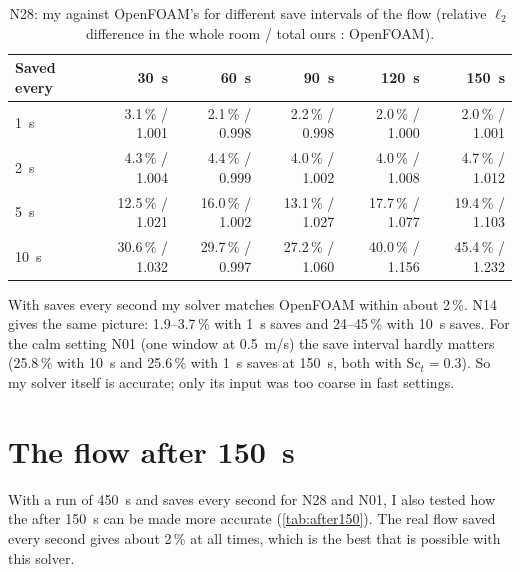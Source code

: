 \begin{table}[h]
  \centering
  \caption{N28: my \cotwo{} against OpenFOAM's \cotwo{} for different save intervals of the flow (relative
  $\ell_2$ difference in the whole room / total \cotwo{} ours : OpenFOAM).}
  \label{tab:saves}
  \small
  \begin{tabular}{lrrrrr}
    \toprule
    Saved every & 30~s & 60~s & 90~s & 120~s & 150~s\\
    \midrule
    1~s  & 3.1\,\% / 1.001 & 2.1\,\% / 0.998 & 2.2\,\% / 0.998 & 2.0\,\% / 1.000 & 2.0\,\% / 1.001\\
    2~s  & 4.3\,\% / 1.004 & 4.4\,\% / 0.999 & 4.0\,\% / 1.002 & 4.0\,\% / 1.008 & 4.7\,\% / 1.012\\
    5~s  & 12.5\,\% / 1.021 & 16.0\,\% / 1.002 & 13.1\,\% / 1.027 & 17.7\,\% / 1.077 & 19.4\,\% / 1.103\\
    10~s & 30.6\,\% / 1.032 & 29.7\,\% / 0.997 & 27.2\,\% / 1.060 & 40.0\,\% / 1.156 & 45.4\,\% / 1.232\\
    \bottomrule
  \end{tabular}
\end{table}

With saves every second my solver matches OpenFOAM within about 2\,\%. N14 gives the same picture: 1.9--3.7\,\%
with 1~s saves and 24--45\,\% with 10~s saves. For the calm setting N01 (one window at 0.5~m/s) the save
interval hardly matters (25.8\,\% with 10~s and 25.6\,\% with 1~s saves at 150~s, both with $\mathrm{Sc}_t=0.3$).
So my solver itself is accurate; only its input was too coarse in fast settings.

\section{The flow after 150~s}
With a run of 450~s and saves every second for N28 and N01, I also tested how the \cotwo{} after 150~s can be
made more accurate (\cref{tab:after150}). The real flow saved every second gives about 2\,\% at all times,
which is the best that is possible with this solver.

